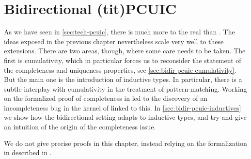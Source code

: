 \chapter{Bidirectional \kl(tit){PCUIC}}
\label{chap:bidir-pcuic}

\margintoc

As we have seen in \cref{sec:tech-pcuic}, there is much more to the real  than
.
The ideas exposed in the previous chapter nevertheless
scale very well to these extensions.
There are two areas, though, where some care needs to be taken.
The first is cumulativity, which in particular forces us to reconsider the statement
of the completeness and uniqueness properties, see \cref{sec:bidir-pcuic-cumulativity}.
But the main one is the introduction of inductive types. In particular, there is a subtle
interplay with cumulativity in the treatment of pattern-matching.
Working on the formalized proof of completeness in  led to the discovery of
an incompleteness bug in the kernel of  linked to this.
In \cref{sec:bidir-pcuic-inductives} we show how the bidirectional setting adapts to
inductive types, and try and give an intuition of the origin of the completeness issue.

We do not give precise proofs in this chapter,
instead relying on the formalization in  described in .


  
